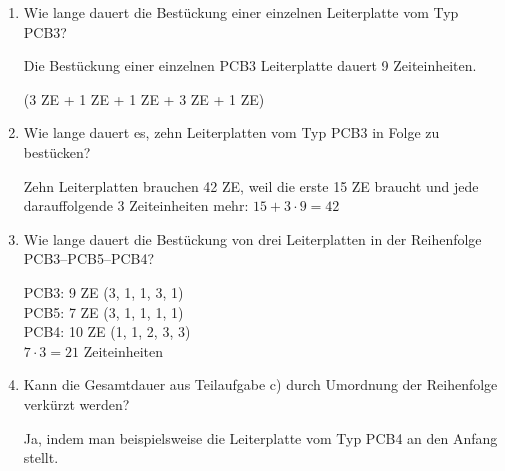 \documentclass[a4paper, 12pt, margins=2cm]{homework}
\begin{document}
  \begin{problem}
  \end{problem}
  \begin{solution}\hfill
    
    \begin{enumerate}[label=(\alph*)]\itemsep0pt
      \item Wie lange dauert die Bestückung einer einzelnen Leiterplatte vom Typ PCB3?

            Die Bestückung einer einzelnen PCB3 Leiterplatte dauert 9 Zeiteinheiten.
            \begin{center}
              (3 ZE + 1 ZE + 1 ZE + 3 ZE + 1 ZE) \\ \hfill
            \end{center}
      \item Wie lange dauert es, zehn Leiterplatten vom Typ PCB3 in Folge zu bestücken?

            Zehn Leiterplatten brauchen 42 ZE, weil die erste 15 ZE braucht und jede
            darauffolgende 3 Zeiteinheiten mehr: $15 + 3\cdot 9 = 42$
      \item Wie lange dauert die Bestückung von drei Leiterplatten in der Reihenfolge PCB3–PCB5–PCB4?

            PCB3: 9  ZE (3, 1, 1, 3, 1)\\
            PCB5: 7  ZE (3, 1, 1, 1, 1)\\
            PCB4: 10 ZE (1, 1, 2, 3, 3)\\

            $7\cdot 3 = 21$ Zeiteinheiten

      \item Kann die Gesamtdauer aus Teilaufgabe c) durch Umordnung der Reihenfolge verkürzt werden?

            Ja, indem man beispielsweise die Leiterplatte vom Typ PCB4 an den Anfang stellt.
    \end{enumerate}
  \end{solution}
\end{document}
